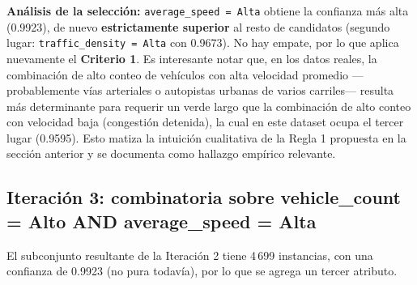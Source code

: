 \documentclass[12pt,a4paper]{article}
\begin{document}
\textbf{Análisis de la selección:} \texttt{average\_speed = Alta} obtiene
la confianza más alta (0.9923), de nuevo \textbf{estrictamente superior}
al resto de candidatos (segundo lugar: \texttt{traffic\_density = Alta}
con 0.9673). No hay empate, por lo que aplica nuevamente el
\textbf{Criterio 1}. Es interesante notar que, en los datos reales, la
combinación de alto conteo de vehículos con alta velocidad promedio
---probablemente vías arteriales o autopistas urbanas de varios
carriles--- resulta más determinante para requerir un verde largo que la
combinación de alto conteo con velocidad baja (congestión detenida), la
cual en este dataset ocupa el tercer lugar (0.9595). Esto matiza la
intuición cualitativa de la Regla 1 propuesta en la sección anterior y
se documenta como hallazgo empírico relevante.

\subsection{Iteración 3: combinatoria sobre vehicle\_count = Alto AND average\_speed = Alta}

El subconjunto resultante de la Iteración 2 tiene 4\,699 instancias, con
una confianza de 0.9923 (no pura todavía), por lo que se agrega un tercer
atributo.

\begin{table}[H]
\centering
\caption{Iteración 3 -- vehicle\_count=Alto AND average\_speed=Alta AND ... (clase Larga)}
\renewcommand{\arraystretch}{1.2}
\end{table}
\end{document}
